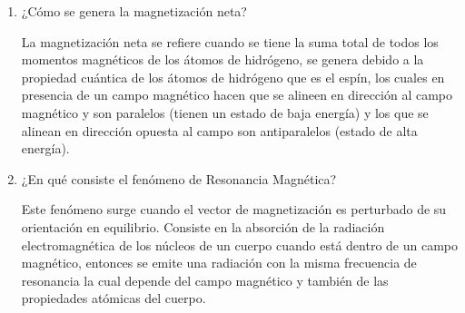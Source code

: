 \begin{enumerate}
  \item ¿Cómo se genera la magnetización neta?
  
La magnetización neta se refiere cuando se tiene la suma total de todos los momentos magnéticos de los átomos de hidrógeno, se genera debido a la propiedad cuántica de los átomos de hidrógeno que es el espín, los cuales en presencia de un campo magnético  hacen que se alineen en dirección al campo magnético y son paralelos (tienen un estado de baja energía) y los que se alinean en dirección opuesta al campo son antiparalelos (estado de alta energía). 






  \item ¿En qué consiste el fenómeno de Resonancia Magnética?
  
Este fenómeno surge cuando el vector de magnetización es perturbado de su orientación en equilibrio. Consiste en la absorción de la radiación electromagnética de los núcleos de un cuerpo cuando está dentro de un campo magnético, entonces se emite una radiación con la misma frecuencia de resonancia la cual depende del campo magnético  y también de las propiedades atómicas del cuerpo. 


\end{enumerate}










